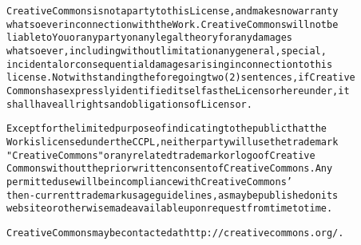 \documentclass{report}
\begin{document}
\begin{alltt}
Creative Commons is not a party to this License, and makes no warranty
whatsoever in connection with the Work. Creative Commons will not be
liable to You or any party on any legal theory for any damages
whatsoever, including without limitation any general, special,
incidental or consequential damages arising in connection to this
license. Notwithstanding the foregoing two (2) sentences, if Creative
Commons has expressly identified itself as the Licensor hereunder, it
shall have all rights and obligations of Licensor.

Except for the limited purpose of indicating to the public that the
Work is licensed under the CCPL, neither party will use the trademark
"Creative Commons" or any related trademark or logo of Creative
Commons without the prior written consent of Creative Commons. Any
permitted use will be in compliance with Creative Commons'
then-current trademark usage guidelines, as may be published on its
website or otherwise made available upon request from time to time.

Creative Commons may be contacted at http://creativecommons.org/.
\end{alltt}
\end{document}
